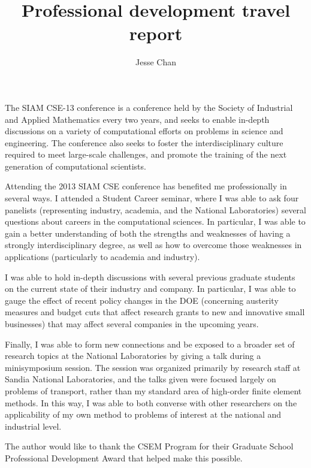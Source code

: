\documentclass[letterpaper,10pt]{article}
\begin{document}
\author{Jesse Chan}
\title{Professional development travel report}
\maketitle

The SIAM CSE-13 conference is a conference held by the Society of Industrial and Applied Mathematics every two years, and seeks to enable in-depth discussions on a variety of computational efforts on problems in science and engineering.  The conference also seeks to foster the interdisciplinary culture required to meet large-scale challenges, and promote the training of the next generation of computational scientists.  


Attending the 2013 SIAM CSE conference has benefited me professionally in several ways.  I attended a Student Career seminar, where I was able to ask four panelists (representing industry, academia, and the National Laboratories) several questions about careers in the computational sciences.  In particular, I was able to gain a better understanding of both the strengths and weaknesses of having a strongly interdisciplinary degree, as well as how to overcome those weaknesses in applications (particularly to academia and industry).  


I was able to hold in-depth discussions with several previous graduate students on the current state of their industry and company.  In particular, I was able to gauge the effect of recent policy changes in the DOE (concerning austerity measures and budget cuts that affect research grants to new and innovative small businesses) that may affect several companies in the upcoming years.  


Finally, I was able to form new connections and be exposed to a broader set of research topics at the National Laboratories by giving a talk during a minisymposium session.  The session was organized primarily by research staff at Sandia National Laboratories, and the talks given were focused largely on problems of transport, rather than my standard area of high-order finite element methods.  In this way, I was able to both converse with other researchers on the applicability of my own method to problems of interest at the national and industrial level.  

The author would like to thank the CSEM Program for their Graduate School Professional Development Award that helped make this possible.
\end{document}
